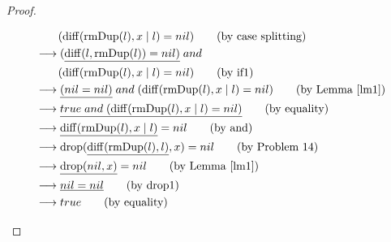 \documentclass[12pt, a4paper]{article}
\newcommand{\rel}[1]{\mathrel{#1}}
\newcommand{\rmx}[1]{\mathrm{#1}}
\newcommand{\larrow}{\longrightarrow}
\newcommand{\under}{\underline}
\begin{document}
\begin{proof}
\begin{description}
\begin{align*}
	&\quad \quad (\rmx{diff}(\rmx{rmDup}(l), x \mid l) = nil) \tag{by case splitting} \\
	&\larrow (\under{\rmx{diff}(l, \rmx{rmDup}(l)) = nil)} \rel{and} \\
	&\quad \quad (\rmx{diff}(\rmx{rmDup}(l), x \mid l) = nil) \tag{by if1} \\
	&\larrow \under{(nil = nil)} \rel{and} (\rmx{diff}(\rmx{rmDup}(l), x \mid l) = nil) \tag{by Lemma~\ref{lm1}} \\
	&\larrow \under{true \rel{and} (\rmx{diff}(\rmx{rmDup}(l), x \mid l) = nil)} \tag{by equality} \\
	&\larrow \under{\rmx{diff}(\rmx{rmDup}(l), x \mid l)} = nil \tag{by and} \\
	&\larrow \rmx{drop}(\under{\rmx{diff}(\rmx{rmDup}(l), l)}, x) = nil \tag{by Problem 14} \\
	&\larrow \under{\rmx{drop}(nil, x)} = nil \tag{by Lemma~\ref{lm1}} \\
	&\larrow \under{nil = nil} \tag{by drop1} \\
	&\larrow true \tag{by equality} \\
\end{align*}


\end{description}
\end{proof}
\end{document}
